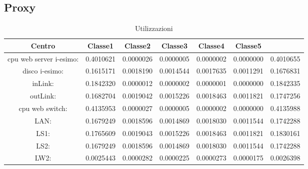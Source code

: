 \subsection{Proxy}
\begin{table}[H]
\begin{center}\begin{scriptsize}
\begin{tabular}{||c|c|c|c|c|c||}
\hline
Centro &Classe1 &Classe2 &Classe3 &Classe4 &Classe5\\
\hline
\hline
 cpu web server i-esimo: 	&0.4010621	&0.0000026	&0.0000005	&0.0000002	&0.0000000	&0.4010655	\\\hline
 disco i-esimo: 	&0.1615171	&0.0018190	&0.0014544	&0.0017635	&0.0011291	&0.1676831	\\\hline
 inLink: 	&0.1842320	&0.0000012	&0.0000002	&0.0000001	&0.0000000	&0.1842335	\\\hline
 outLink: 	&0.1682704	&0.0019042	&0.0015226	&0.0018463	&0.0011821	&0.1747256	\\\hline
 cpu web switch: 	&0.4135953	&0.0000027	&0.0000005	&0.0000002	&0.0000000	&0.4135988	\\\hline
 LAN: 	&0.1679249	&0.0018596	&0.0014869	&0.0018030	&0.0011544	&0.1742288	\\\hline
 LS1: 	&0.1765609	&0.0019043	&0.0015226	&0.0018463	&0.0011821	&0.1830161	\\\hline
 LS2:	&0.1679249	&0.0018596	&0.0014869	&0.0018030	&0.0011544	&0.1742288	\\\hline
 LW2: 	&0.0025443	&0.0000282	&0.0000225	&0.0000273	&0.0000175	&0.0026398	\\\hline
\end{tabular}
\end{scriptsize}\end{center}
\caption{Utilizzazioni}
\label{utilizzazioni}
\end{table}

